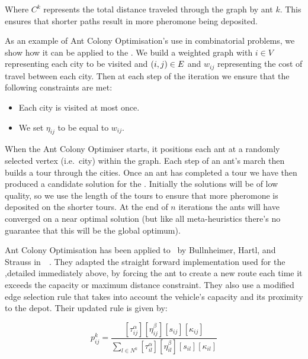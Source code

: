 Where $C^k$ represents the total distance traveled through the graph by ant $k$. This ensures that shorter paths result in more pheromone being deposited.

As an example of Ant Colony Optimisation's use in combinatorial problems, we show how it can be applied to the \TSP. We build a weighted graph with $i \in V$ representing each city to be visited and $(i,j) \in E$ and $w_{ij}$ representing the cost of travel between each city. Then at each step of the iteration we ensure that the following constraints are met:

\begin{itemize}
   \item Each city is visited at most once.
   \item We set $\eta_{ij}$ to be equal to $w_{ij}$.
\end{itemize}

When the Ant Colony Optimiser starts, it positions each ant at a randomly selected vertex (i.e.~city) within the graph. Each step of an ant's march then builds a tour through the cities. Once an ant has completed a tour we have then produced a candidate solution for the \TSP. Initially the solutions will be of low quality, so we use the length of the tours to ensure that more pheromone is deposited on the shorter tours. At the end of $n$ iterations the ants will have converged on a near optimal solution (but like all meta-heuristics there's no guarantee that this will be the global optimum).

 
Ant Colony Optimisation has been applied to \VRP\ by Bullnheimer, Hartl, and Strauss in~\cite{BHS:1999A}~\cite{BHS:1999B}. They adapted the straight forward implementation used for the \TSP,detailed immediately above, by forcing the ant to create a new route each time it exceeds the capacity or maximum distance constraint. They also use a modified edge selection rule that takes into account the vehicle's capacity and its proximity to the depot. Their updated rule is given by:

\[
   p_{ij}^k = \frac{ [\tau_{ij}^{\alpha}] [\eta_{ij}^{\beta}] [s_{ij}] [\kappa_{ij}]  }{ \sum_{l \in N^k} [\tau_{il}^{\alpha}] [\eta_{il}^{\beta}] [s_{il}] [\kappa_{il}] }
\]

